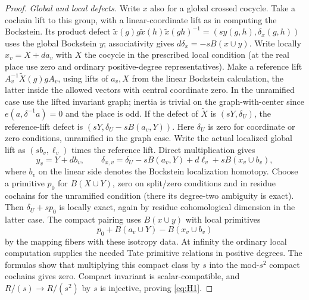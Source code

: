 \begin{proof}
\emph{Global and local defects.}
Write \(x\) also for a global crossed cocycle. Take a cochain lift to this group, with a linear-coordinate lift as in computing the Bockstein. Its product defect \(\widetilde x(g)g\widetilde x(h)\widetilde x(gh)^{-1}=(s y(g,h),\delta_x(g,h))\) uses the global Bockstein \(y\); associativity gives \(d\delta_x=-sB(x\cup y)\). Write locally \(x_v=X+d a_v\) with \(X\) the cocycle in the prescribed local condition (at the real place use zero and ordinary positive-degree representatives). Make a reference lift \(A_v^{-1}\widetilde X(g)g A_v\), using lifts of \(a_v,X\) from the linear Bockstein calculation, the latter inside the allowed vectors with central coordinate zero. In the unramified case use the lifted invariant graph; inertia is trivial on the graph-with-center since \(e(a,\delta^{-1}a)=0\) and the place is odd. If the defect of \(\widetilde X\) is \((sY,\delta_U)\), the reference-lift defect is \((sY,\delta_U-sB(a_v,Y))\). Here \(\delta_U\) is zero for coordinate or zero conditions, unramified in the graph case. Write the actual localized global lift as \((s b_v,\ell_v)\) times the reference lift. Direct multiplication gives
\[
                y_v=Y+d b_v,\qquad
   \delta_{x,v}=\delta_U-sB(a_v,Y)+d\ell_v+sB(x_v\cup b_v),
\]
where \(b_v\) on the linear side denotes the Bockstein localization homotopy. Choose a primitive \(p_0\) for \(B(X\cup Y)\), zero on split/zero conditions and in residue cochains for the unramified condition (there its degree-two ambiguity is exact). Then \(\delta_U+s p_0\) is locally exact, again by residue cohomological dimension in the latter case. The compact pairing uses \(B(x\cup y)\) with local primitives
\[
                     p_0+B(a_v\cup Y)-B(x_v\cup b_v)
\]
by the mapping fibers with these isotropy data. At infinity the ordinary local computation supplies the needed Tate primitive relations in positive degrees. The formulas show that multiplying this compact class by \(s\) into the mod-\(s^2\) compact cochains gives zero. Compact invariant is scalar-compatible, and \(R/(s)\to R/(s^2)\) by \(s\) is injective, proving \eqref{eq:H1}.


\end{proof}
